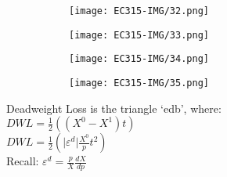\documentclass[11pt, english]{article}
\begin{document}
	\begin{figure}[H]
        \begin{center}
                \begin{subfigure}[t]{4cm}
                \begin{center}
                        \texttt{[image: EC315-IMG/32.png]}
                \end{center}
                \end{subfigure}
                \begin{subfigure}[t]{4cm}
                \begin{center}
                        \texttt{[image: EC315-IMG/33.png]}
                \end{center}
                \end{subfigure}
                \begin{subfigure}[t]{4cm}
                \begin{center}
                        \texttt{[image: EC315-IMG/34.png]}
                \end{center}
                \end{subfigure}
        \par
                \begin{subfigure}[t]{4cm}
                \begin{center}
                        \texttt{[image: EC315-IMG/35.png]}
                \end{center}
                \end{subfigure}
        \end{center}
        \end{figure}

	Deadweight Loss is the triangle `edb', where:\\
	$DWL=\frac{1}{2}((X^0-X^1)t)$\\
	$DWL=\frac{1}{2}\left(\vert\varepsilon^d\vert\frac{X^0}{p}t^2\right)$\\
	Recall: $\varepsilon^d=\frac{p}{X}\frac{dX}{dp}$
\end{document}
